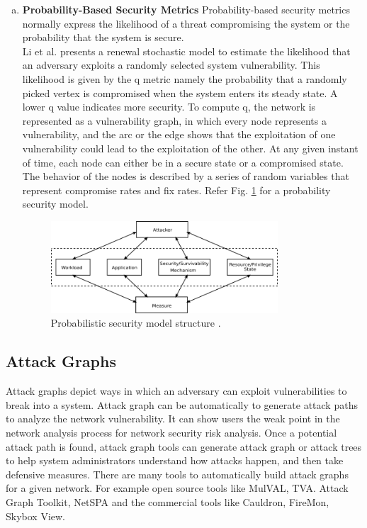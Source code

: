 \documentclass[pdftex,english,oribibl]{llncs}
\begin{document}
\begin{enumerate}[(a)]
{	Even though MTTF provide useful security level information, they do not take into account of partial or interrupted attacks (which can also cause damage to the system).}

	\item {\textbf{Probability-Based Security Metrics}\newline 
	Probability-based security metrics normally express the likelihood of a threat compromising the system or the probability that the system is secure.\\
	
 	Li et al. \cite{4695835_Li} presents a renewal stochastic model to estimate the likelihood that an adversary exploits a randomly selected system vulnerability. This likelihood is given by the q metric namely the probability that a randomly picked vertex is compromised when the system enters its steady state. A lower q value indicates more security. To compute q, the network is represented as a vulnerability graph, in which every node represents a vulnerability, and the arc or the edge shows that the exploitation of one vulnerability could lead to the exploitation of the other. At any given instant of time, each node can either be in a secure state or a compromised state. The behavior of the nodes is described by a series of random variables that represent compromise rates and fix rates. Refer Fig. \ref{fig:probablistic_sec_mod} for a probability security model.}
 	\begin{figure}[h]
 		\centering\includegraphics[width=0.8\textwidth]{figures/probablistic_sec_mod.png}
 		\caption{Probabilistic security model structure \cite{1335467_Nicol}.}
 		\label{fig:probablistic_sec_mod}
 	\end{figure}
\end{enumerate}

\subsection{Attack Graphs}  
Attack graphs depict ways in which an adversary can exploit vulnerabilities to break into a system. Attack graph can be automatically to generate attack paths to analyze the network vulnerability. It can show users the weak point in the network analysis process for network security risk analysis. Once a potential attack path is found, attack graph tools can generate attack graph or attack trees to help system administrators understand how attacks happen, and then take defensive measures. There are many tools to automatically build attack graphs for a given network. For example open source tools like MulVAL, TVA. Attack Graph Toolkit, NetSPA and the commercial tools like Cauldron, FireMon, Skybox View.
\end{document}
